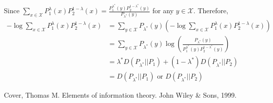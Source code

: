 \documentclass{article}
\begin{document}
Since $\sum_{x\in \mathcal{X}} P_1^{\lambda}(x)  P_2^{1-\lambda}(x) = \frac{P_1^{\lambda^*}(y)P_2^{1-\lambda^*}(y)}
{P_{\lambda^*}(y)}$ for any $y\in \mathcal{X}$. Therefore,
\begin{align*}
-\log \sum_{x\in \mathcal{X}} P_1^{\lambda}(x)  P_2^{1-\lambda}(x) &= \sum_{y \in \mathcal{X}} P_{\lambda^*}(y) \left(-\log \sum_{x\in \mathcal{X}} P_1^{\lambda}(x)  P_2^{1-\lambda}(x) \right)\\
& = \sum_{y \in \mathcal{X}} P_{\lambda^*}(y) \log\left(\frac{P_{\lambda^*}(y)}{P_1^{\lambda^*}(y)P_2^{1-\lambda^*}(y)}\right) \\
& = \lambda^* D(P_{\lambda^*} || P_1) + (1-\lambda^*) D(P_{\lambda^*} || P_2) \\
& = D(P_{\lambda^*} || P_1) \textrm{ or } D(P_{\lambda^*} || P_2)
\end{align*}
\begin{thebibliography}{9}
	 Cover, Thomas M. Elements of information theory. John Wiley \& Sons, 1999.
\end{thebibliography}
\end{document}
